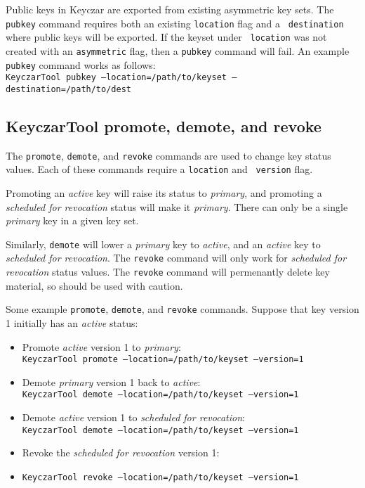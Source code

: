 \documentclass{llncs}
\begin{document}
Public keys in Keyczar are exported from existing asymmetric key sets. The
{\tt pubkey} command requires both an existing {\tt location} flag and a {\tt
destination} where public keys will be exported. If the keyset under {\tt
location} was not created with an {\tt asymmetric} flag, then a {\tt pubkey}
command will fail. An example {\tt pubkey} command works as follows: \\
{\tt KeyczarTool pubkey --location=/path/to/keyset --destination=/path/to/dest}

\subsection{KeyczarTool promote, demote, and revoke}

The {\tt promote}, {\tt demote}, and {\tt revoke} commands are used to change
key status values. Each of these commands require a {\tt location} and {\tt
version} flag. 

Promoting an {\it active} key will raise its status to
{\it primary}, and promoting a {\it scheduled for revocation} status will make
it {\it primary}. There can only be a single {\it primary} key in a given key
set. 

Similarly, {\tt demote} will lower a {\it primary} key to {\it active},
and an {\it active} key to {\it scheduled for revocation}. The {\tt revoke}
command will only work for {\it scheduled for revocation} status values.
The {\tt revoke} command will permenantly delete key material, so should be
used with caution.

Some example {\tt promote}, {\tt demote}, and {\tt revoke} commands. Suppose
that key version 1 initially has an {\it active} status:
\begin{itemize}
\item Promote {\it active} version 1 to {\it primary}: \\
{\tt KeyczarTool promote --location=/path/to/keyset --version=1}
\item Demote {\it primary} version 1 back to {\it active}: \\
{\tt KeyczarTool demote --location=/path/to/keyset --version=1}
\item Demote {\it active} version 1 to {\it scheduled for revocation}: \\
{\tt KeyczarTool demote --location=/path/to/keyset --version=1}
\item Revoke the {\it scheduled for revocation} version 1:  
\item {\tt KeyczarTool revoke --location=/path/to/keyset --version=1}
\end{itemize}
\end{document}
